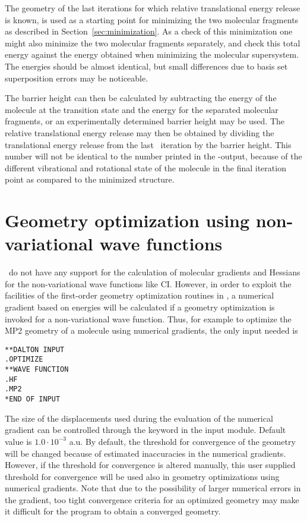 The geometry of the last iterations for which relative translational
energy release is known, is used as a starting point for minimizing
the two molecular fragments as described in
Section~\ref{sec:minimization}. As a check of this minimization one
might also minimize the two molecular fragments separately, and check
this total energy against the energy obtained when minimizing the
molecular supersystem. The energies should be almost identical, but
small differences due to basis set superposition errors may be
noticeable.

The barrier height can then be calculated by subtracting the energy of
the molecule at the transition state and the energy for the separated
molecular fragments, or an experimentally determined barrier height
may be used. The relative translational energy release may then be
obtained  by dividing the translational energy release
from the last \dalton\ iteration by the barrier height. This number will
not be identical to the number printed in the \dalton -output, because
of the different vibrational and rotational state of
the molecule in the final iteration point as compared to the minimized
structure.

\section{Geometry optimization using non-variational wave
functions}\label{sec:nonvargeom}

\dalton\ do not have any support for the calculation of molecular
gradients and Hessians for the non-variational wave functions like
CI. However, in order to
exploit the facilities of the first-order
geometry optimization routines in {\dalton}, a numerical
gradient based
on energies will be calculated if a geometry optimization is invoked
for a non-variational wave function. Thus, for example to optimize the
MP2 geometry of a molecule using numerical gradients, the only input
needed is

\begin{verbatim}
**DALTON INPUT
.OPTIMIZE
**WAVE FUNCTION
.HF
.MP2
*END OF INPUT
\end{verbatim}

The size of the displacements used during the evaluation of the
numerical gradient can be controlled through the keyword
 in the  input module. Default value is
$1.0\cdot 10^{-3}$ a.u. By default, the threshold for convergence
of the geometry will be changed because of estimated inaccuracies
in the numerical gradients. However, if the threshold for
convergence is altered manually, this user supplied threshold for
convergence will be used also in geometry optimizations using
numerical gradients. Note that due to
the possibility of larger numerical errors in the gradient, too
tight convergence criteria for an optimized geometry may make it
difficult for the program to obtain a converged geometry.
